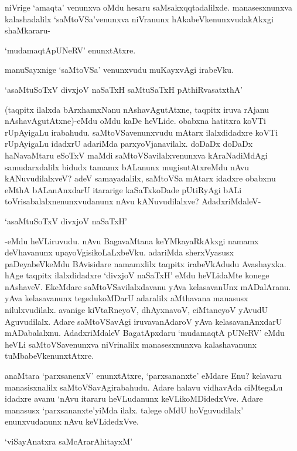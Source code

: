 niVrige `amaqta' venunxva oMdu hesaru saMsakxqqtadalilxde. manasesxnunxva kalashadalilx `saMtoVSa'venunxva niVranunx hAkabeVkenunxvudakAkxgi shaMkararu-

\begin{center}
`mudamaqtApUNeRV' enunxtAtxre.
\end{center}

manuSayxnige `saMtoVSa' venunxvudu muKayxvAgi irabeVku.

\begin{shloka}
`asaMtuSoTxV divxjoV naSaTxH saMtuSaTxH pAthiRvasatxthA'
\end{shloka}

(taqpitx ilalxda bArxhamxNanu nAshavAgutAtxne, taqpitx iruva rAjanu nAshavAgutAtxne)-eMdu oMdu kaDe heVLide. obabxna hatitxra koVTi rUpAyigaLu irabahudu. saMtoVSavenunxvudu mAtarx ilalxdidadxre koVTi rUpAyigaLu idadxrU adariMda parxyoVjanavilalx. doDaDx doDaDx haNavaMtaru eSoTxV maMdi saMtoVSavilalxvenunxva kAraNadiMdAgi samudarxdalilx bidudx tamamx bALanunx mugisutAtxreMdu nAvu kANuvudilalxveV? adeV samayadalilx, saMtoVSa mAtarx idadxre obabxnu eMthA bALanAnxdarU itararige kaSaTxkoDade pUtiRyAgi bALi toVrisabalalxnenunxvudanunx nAvu kANuvudilalxve? AdadxriMdaleV-

\begin{shloka}
`asaMtuSoTxV divxjoV naSaTxH'
\end{shloka}

-eMdu heVLiruvudu. nAvu BagavaMtana keYMkayaRkAkxgi namamx deVhavanunx upayoVgisikoLaLxbeVku. adariMda sherxVyasusx paDeyabeVkeMdu BAvisidare namamxlilx taqpitx irabeVkAdudu Avashayxka. hAge taqpitx ilalxdidadxre `divxjoV naSaTxH' eMdu heVLidaMte konege nAshaveV. EkeMdare saMtoVSavilalxdavanu yAva kelasavanUnx mADalAranu. yAva kelasavanunx tegedukoMDarU adaralilx aMthavana manasusx nilulxvudilalx. avanige kiVtaRneyoV, dhAyxnavoV, ciMtaneyoV yAvudU Aguvudilalx. Adare saMtoVSavAgi iruvavanAdaroV yAva kelasavanAnxdarU mADabalalxnu. AdadxriMdaleV BagatApxdaru `mudamaqtA pUNeRV' eMdu heVLi saMtoVSavenunxva niVrinalilx manasesxnunxva kalashavanunx tuMbabeVkenunxtAtxre.

anaMtara `parxsanenxV' enunxtAtxre, `parxsananxte' eMdare Enu? kelavaru manasisxnalilx saMtoVSavAgirabahudu. Adare halavu vidhavAda ciMtegaLu idadxre avanu `nAvu itararu heVLudanunx keVLikoMDidedxVve. Adare manasusx `parxsananxte'yiMda ilalx. talege oMdU hoVguvudilalx' enunxvudanunx nAvu keVLidedxVve.

\begin{shloka}
`viSayAnatxra saMcArarAhitayxM'
\end{shloka}

